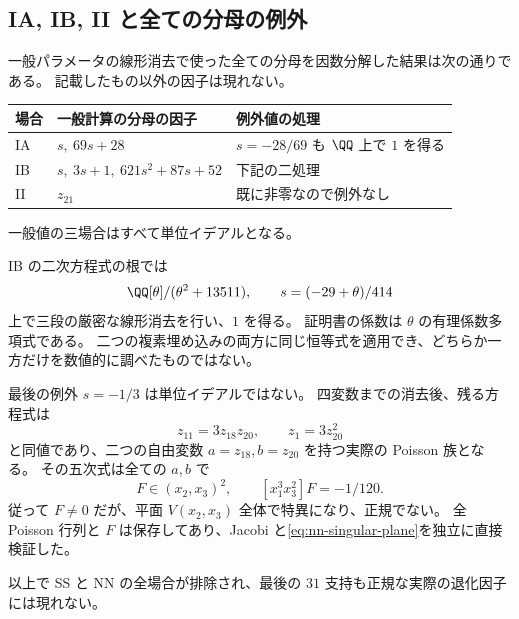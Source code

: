 \subsection{IA, IB, II と全ての分母の例外}
一般パラメータの線形消去で使った全ての分母を因数分解した結果は次の通りである。
記載したもの以外の因子は現れない。

\begin{center}\small
\begin{tabular}{@{}lll@{}}\toprule
場合 & 一般計算の分母の因子 & 例外値の処理\\\midrule
IA & $s,\ 69s+28$ & $s=-28/69$ も $\QQ$ 上で $1$ を得る\\
IB & $s,\ 3s+1,\ 621s^2+87s+52$ & 下記の二処理\\
II & $z_{21}$ & 既に非零なので例外なし\\\bottomrule
\end{tabular}\end{center}
一般値の三場合はすべて単位イデアルとなる。

IB の二次方程式の根では
\[
 \QQ[\theta]/(\theta^2+13511),\qquad s=(-29+\theta)/414
\]
上で三段の厳密な線形消去を行い、$1$ を得る。
証明書の係数は $\theta$ の有理係数多項式である。
二つの複素埋め込みの両方に同じ恒等式を適用でき、どちらか一方だけを数値的に調べたものではない。

最後の例外 $s=-1/3$ は単位イデアルではない。
四変数までの消去後、残る方程式は
\[
 z_{11}=3z_{18}z_{20},\qquad z_1=3z_{20}^2
\]
と同値であり、二つの自由変数 $a=z_{18},b=z_{20}$ を持つ実際の Poisson 族となる。
その五次式は全ての $a,b$ で
\begin{equation}\label{eq:nn-singular-plane}
 F\in(x_2,x_3)^2,\qquad [x_1^3x_3^2]F=-1/120.
\end{equation}
従って $F\ne0$ だが、平面 $V(x_2,x_3)$ 全体で特異になり、正規でない。
全 Poisson 行列と $F$ は保存してあり、Jacobi と\eqref{eq:nn-singular-plane}を独立に直接検証した。

以上で SS と NN の全場合が排除され、最後の $31$ 支持も正規な実際の退化因子には現れない。
